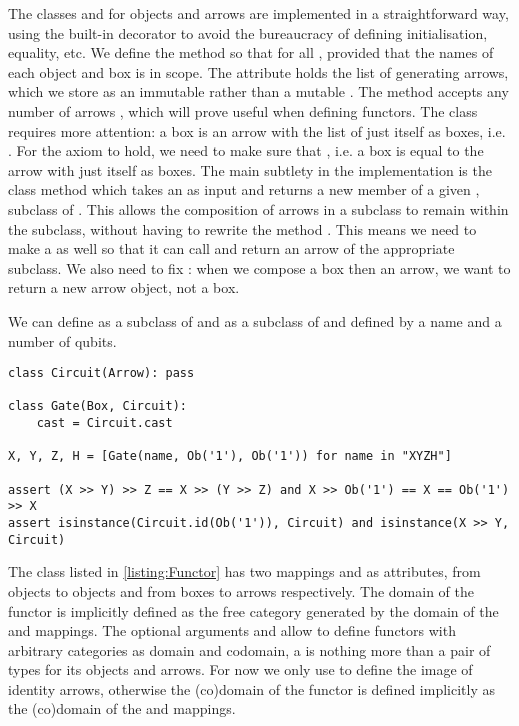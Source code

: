 The classes  and  for objects and arrows are implemented in a straightforward way, using the built-in  decorator to avoid the bureaucracy of defining initialisation, equality, etc.
We define the method  so that  for all , provided that the names of each object and box is in scope.
The attribute  holds the list of generating arrows, which we store as an immutable  rather than a mutable .
The method  accepts any number of arrows , which will prove useful when defining functors.
The  class requires more attention: a box  is an arrow with the list of just itself as boxes, i.e. .
For the axiom  to hold, we need to make sure that , i.e. a box is equal to the arrow with just itself as boxes.
The main subtlety in the implementation is the class method  which takes an  as input and returns a new member of a given , subclass of .
This allows the composition of arrows in a subclass to remain within the subclass, without having to rewrite the method .
This means we need to make  a  as well so that it can call  and return an arrow of the appropriate subclass.
We also need to fix : when we compose a box then an arrow, we want to return a new arrow object, not a box.

\begin{example}\label{example:Circuit}
We can define  as a subclass of  and  as a subclass of  and  defined by a name and a number of qubits.

\begin{verbatim}
class Circuit(Arrow): pass

class Gate(Box, Circuit):
    cast = Circuit.cast

X, Y, Z, H = [Gate(name, Ob('1'), Ob('1')) for name in "XYZH"]

assert (X >> Y) >> Z == X >> (Y >> Z) and X >> Ob('1') == X == Ob('1') >> X
assert isinstance(Circuit.id(Ob('1')), Circuit) and isinstance(X >> Y, Circuit)
\end{verbatim}
\end{example}

The  class listed in \ref{listing:Functor} has two mappings  and  as attributes, from objects to objects and from boxes to arrows respectively.
The domain of the functor is implicitly defined as the free category generated by the domain of the  and  mappings.
The optional arguments  and  allow to define functors with arbitrary categories as domain and codomain, a  is nothing more than a pair of types for its objects and arrows.
For now we only use  to define the image of identity arrows, otherwise the (co)domain of the functor is defined implicitly as the (co)domain of the  and  mappings.

